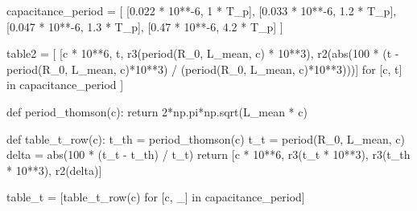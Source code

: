 \documentclass[12pt, a4paper]{article}
\begin{document}
\begin{pycode}
capacitance_period = [
  [0.022 * 10**-6, 1 * T_p],
  [0.033 * 10**-6, 1.2 * T_p],
  [0.047 * 10**-6, 1.3 * T_p],
  [0.47 * 10**-6, 4.2 * T_p]
]

table2 = [
  [c * 10**6, t, r3(period(R_0, L_mean, c) * 10**3), r2(abs(100 * (t - period(R_0, L_mean, c)*10**3) / (period(R_0, L_mean, c)*10**3)))]
  for [c, t] in capacitance_period
]

def period_thomson(c): return 2*np.pi*np.sqrt(L_mean * c)

def table_t_row(c):
  t_th = period_thomson(c)
  t_t = period(R_0, L_mean, c)
  delta = abs(100 * (t_t - t_th) / t_t)
  return [c * 10**6, r3(t_t * 10**3), r3(t_th * 10**3), r2(delta)]

table_t = [table_t_row(c) for [c, _] in capacitance_period]
\end{pycode}
\end{document}
